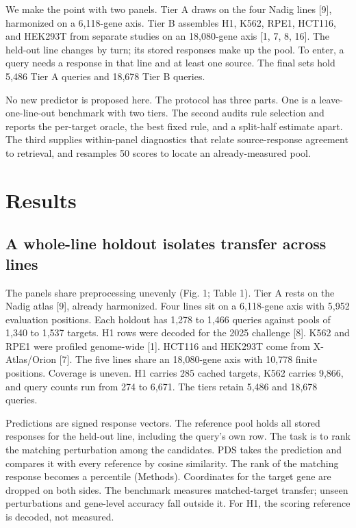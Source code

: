 \documentclass[12pt]{article}
\begin{document}
We make the point with two panels. Tier A draws on the four Nadig lines [9], harmonized on a 6,118-gene axis. Tier B assembles H1, K562, RPE1, HCT116, and HEK293T from separate studies on an 18,080-gene axis [1, 7, 8, 16]. The held-out line changes by turn; its stored responses make up the pool. To enter, a query needs a response in that line and at least one source. The final sets hold 5,486 Tier A queries and 18,678 Tier B queries.

No new predictor is proposed here. The protocol has three parts. One is a leave-one-line-out benchmark with two tiers. The second audits rule selection and reports the per-target oracle, the best fixed rule, and a split-half estimate apart. The third supplies within-panel diagnostics that relate source-response agreement to retrieval, and resamples 50 scores to locate an already-measured pool.

\section{Results}

\subsection{A whole-line holdout isolates transfer across lines}

The panels share preprocessing unevenly (Fig. 1; Table 1). Tier A rests on the Nadig atlas [9], already harmonized. Four lines sit on a 6,118-gene axis with 5,952 evaluation positions. Each holdout has 1,278 to 1,466 queries against pools of 1,340 to 1,537 targets. H1 rows were decoded for the 2025 challenge [8]. K562 and RPE1 were profiled genome-wide [1]. HCT116 and HEK293T come from X-Atlas/Orion [7]. The five lines share an 18,080-gene axis with 10,778 finite positions. Coverage is uneven. H1 carries 285 cached targets, K562 carries 9,866, and query counts run from 274 to 6,671. The tiers retain 5,486 and 18,678 queries.

Predictions are signed response vectors. The reference pool holds all stored responses for the held-out line, including the query's own row. The task is to rank the matching perturbation among the candidates. PDS takes the prediction and compares it with every reference by cosine similarity. The rank of the matching response becomes a percentile (Methods). Coordinates for the target gene are dropped on both sides. The benchmark measures matched-target transfer; unseen perturbations and gene-level accuracy fall outside it. For H1, the scoring reference is decoded, not measured.
\end{document}
